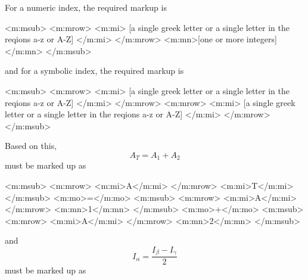 \documentclass[english,a4paper,11pt]{article}
\begin{document}
For a numeric index, the required markup is 
\begin{kodeblokk}
\begin{verbatimtab}[3]
<m:msub>
	<m:mrow>
		<m:mi>
			[a single greek letter 
			or 
			a single letter in the reqions a-z or A-Z]
		</m:mi>
	</m:mrow>
	<m:mn>[one or more integers]</m:mn>
</m:msub>
\end{verbatimtab}
\end{kodeblokk}
and for a symbolic index, the required markup is 
\begin{kodeblokk}
\begin{verbatimtab}[3]
<m:msub>
	<m:mrow>
		<m:mi>
			[a single greek letter 
			or 
			a single letter in the reqions a-z or A-Z]
		</m:mi>
	</m:mrow>
	<m:mrow>
		<m:mi>
			[a single greek letter 
			or 
			a single letter in the reqions a-z or A-Z]
		</m:mi>
	</m:mrow>
</m:msub>
\end{verbatimtab}
\end{kodeblokk}

\begin{eksempler}
Based on this,
	\begin{equation} A_T = A_1 + A_2 \end{equation}
	must be marked up as
\begin{kodeblokk}
\begin{verbatimtab}[3]
<m:msub>
	<m:mrow>
		<m:mi>A</m:mi>
	</m:mrow>
	<m:mi>T</m:mi>
</m:msub>
<m:mo>=</m:mo>
<m:msub>
	<m:mrow>
		<m:mi>A</m:mi>
	</m:mrow>
	<m:mn>1</m:mn>
</m:msub>
<m:mo>+</m:mo>
<m:msub>
	<m:mrow>
		<m:mi>A</m:mi>
	</m:mrow>
	<m:mn>2</m:mn>
</m:msub>
\end{verbatimtab}
\end{kodeblokk}
and
	\begin{equation} I_\alpha = \frac{I_\beta - I_\gamma}{2} \end{equation}
must be marked up as
\begin{kodeblokk}
\end{kodeblokk}
	
\end{eksempler}
\end{document}
